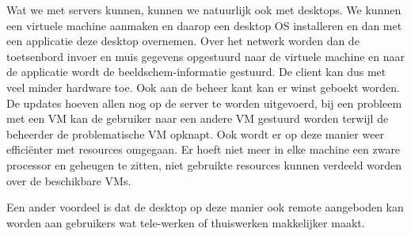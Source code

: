 Wat we met servers kunnen, kunnen we natuurlijk ook met desktops. We kunnen een virtuele machine aanmaken en daarop een desktop OS installeren en dan met een applicatie deze desktop overnemen. Over het netwerk worden dan de toetsenbord invoer en muis gegevens opgestuurd naar de virtuele machine en naar de applicatie wordt de beeldschem-informatie gestuurd. De client kan dus met veel minder hardware toe. Ook aan de beheer kant kan er winst geboekt worden. De updates hoeven allen nog op de server te worden uitgevoerd, bij een probleem met een VM kan de gebruiker naar een andere VM gestuurd worden terwijl de beheerder de problematische VM opknapt. Ook wordt er op deze manier weer effici\"enter met resources omgegaan. Er hoeft niet meer in elke machine een zware processor en geheugen te zitten, niet gebruikte resources kunnen verdeeld worden over de beschikbare VMs.

Een ander voordeel is dat de desktop op deze manier ook remote aangeboden kan worden aan gebruikers wat tele-werken of thuiswerken makkelijker maakt.
